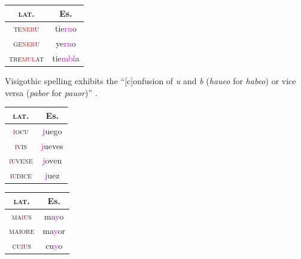 \documentclass{report}[12pt]
\begin{document}
\begin{tcolorbox}[title=Nasal Liquid Cluster from Syncope]
  
\end{tcolorbox}

\begin{tabular}{c c}
  \textsc{lat.} & Es. \\
  \hline
  \textsc{te\textcolor{red}{ner}u} & tie\textcolor{magenta}{rn}o \\
  \textsc{ge\textcolor{red}{ner}u} & ye\textcolor{magenta}{rn}o \\
  \textsc{tre\textcolor{red}{mul}at} & tie\textcolor{magenta}{mbl}a \\
\end{tabular}

\begin{tcolorbox}[title=Nasal Nasal Cluster from Syncope]
  
\end{tcolorbox}

\begin{tcolorbox}[title=Betacism I]

\end{tcolorbox}

Visigothic spelling exhibits the ``[c]onfusion of \emph{u} and \emph{b} (\emph{haueo} for \emph{habeo}) or vice versa (\emph{pabor} for \emph{pauor})'' \cite[p.~159]{latin_paleography}.

\begin{tcolorbox}[title=Initial Yod Fortition]

\end{tcolorbox}

\begin{tabular}{c c}
  \textsc{lat.} & Es. \\
  \hline
  \textsc{\textcolor{red}{i}ocu} & \textcolor{magenta}{j}uego \quad [x] \\
  \textsc{\textcolor{red}{i}vis} & \textcolor{magenta}{j}ueves \quad [x] \\
  \textsc{\textcolor{red}{i}uvene} & \textcolor{magenta}{j}oven \quad [x] \\
  \textsc{\textcolor{red}{i}udice} & \textcolor{magenta}{j}uez \quad [x] \\
\end{tabular}

\begin{tabular}{c c}
  \textsc{lat.} & Es. \\
  \hline
  \textsc{ma\textcolor{red}{i}us} & ma\textcolor{magenta}{y}o \\
  \textsc{ma\textcolor{red}{i}ore} & ma\textcolor{magenta}{y}or \\
  \textsc{cu\textcolor{red}{i}us} & cu\textcolor{magenta}{y}o \\
\end{tabular}
\end{document}
